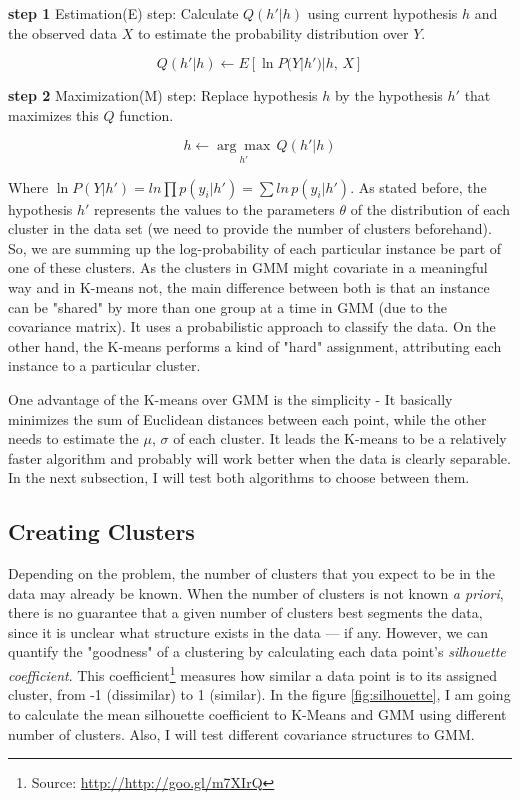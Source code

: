 \documentclass[a4paper]{article}
\begin{document}
\textbf{step 1} Estimation(E) step: Calculate $Q({h}'|h)$ using current hypothesis $h$ and the observed data $X$ to estimate the probability distribution over $Y$.

$$Q({h}'|h) \leftarrow E[\ln P(Y | {h}')| h, \, X] $$

\textbf{step 2} Maximization(M) step: Replace hypothesis $h$ by the hypothesis ${h}'$ that maximizes this $Q$ function.

$$h \leftarrow \underset{{h}'}{\arg \max} \, Q({h}'|h)$$

Where $\ln P(Y | {h}') = ln \prod p(y_i| {h}') = \sum ln\, p(y_i| {h}')$. As stated before, the hypothesis ${h}'$ represents the values to the parameters $\theta$ of the distribution of each cluster in the data set (we need to provide the number of clusters beforehand). So, we are summing up the log-probability of each particular instance be part of one of these clusters. As the clusters in GMM might covariate in a meaningful way and in K-means not, the main difference between both is that an instance can be "shared" by more than one group at a time in GMM (due to the covariance matrix). It uses a probabilistic approach to classify the data. On the other hand, the K-means performs a kind of "hard" assignment, attributing each instance to a particular cluster.

One advantage of the K-means over GMM is the simplicity -  It basically minimizes the sum of Euclidean distances between each point, while the other needs to estimate the $\mu$, $\sigma$ of each cluster. It leads the K-means to be a relatively faster algorithm and probably will work better when the data is clearly separable. In the next subsection, I will test both algorithms to choose between them.

\subsection{Creating Clusters}

Depending on the problem, the number of clusters that you expect to be in the data may already be known. When the number of clusters is not known \textit{a priori}, there is no guarantee that a given number of clusters best segments the data, since it is unclear what structure exists in the data — if any. However, we can quantify the "goodness" of a clustering by calculating each data point's \textit{silhouette coefficient}. This coefficient\footnote{Source: \url{http://http://goo.gl/m7XIrQ}} measures how similar a data point is to its assigned cluster, from -1 (dissimilar) to 1 (similar). In the figure \ref{fig:silhouette}, I am going to calculate the mean silhouette coefficient to K-Means and GMM using different number of clusters. Also, I will test different covariance structures to GMM.
\end{document}
